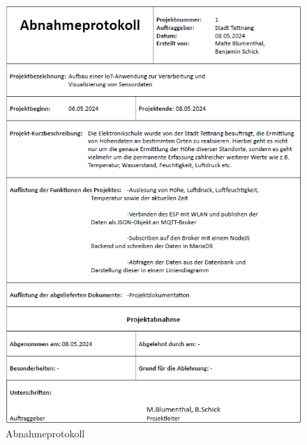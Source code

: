 \begin{figure}[h]
	\centering
	\includegraphics[width=14.5cm]{images/Abnahmeprotokoll.png}
	\caption{Abnahmeprotokoll}
	\label{fig:abnahmeprotokoll}
\end{figure}

